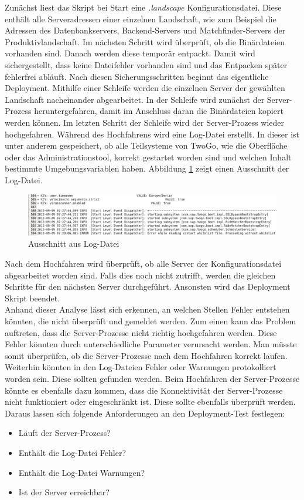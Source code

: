 Zunächst liest das Skript bei Start eine \textit{.landscape} Konfigurationsdatei. Diese enthält alle Serveradressen einer einzelnen Landschaft, wie zum Beispiel die Adressen des Datenbankservers, Backend-Servers und Matchfinder-Servers der Produktivlandschaft. Im nächsten Schritt wird überprüft, ob die Binärdateien vorhanden sind. Danach werden diese temporär entpackt. Damit wird sichergestellt, dass keine Dateifehler vorhanden sind und das Entpacken später fehlerfrei abläuft. Nach diesen Sicherungsschritten beginnt das eigentliche Deployment. Mithilfe einer Schleife werden die einzelnen Server der gewählten Landschaft nacheinander abgearbeitet. In der Schleife wird zunächst der Server-Prozess heruntergefahren, damit  im Anschluss daran die Binärdateien kopiert werden können. Im letzten Schritt der Schleife wird der Server-Prozess wieder hochgefahren. Während des Hochfahrens wird eine Log-Datei erstellt. In dieser ist unter anderem gespeichert, ob alle Teilsysteme von TwoGo, wie die Oberfläche oder das Administrationstool, korrekt gestartet worden sind und welchen Inhalt bestimmte Umgebungsvariablen haben. Abbildung \ref{fig:Log_part} zeigt einen Ausschnitt der Log-Datei.\\
\begin{figure}[H]
\centering
\includegraphics[width=1\linewidth]{../images/Log_part}
\vspace{-20pt}
\caption{Ausschnitt aus Log-Datei}
\label{fig:Log_part}
\end{figure}
 Nach dem Hochfahren wird überprüft, ob alle Server der Konfigurationsdatei abgearbeitet worden sind. Falls dies noch nicht zutrifft, werden die gleichen Schritte für den nächsten Server durchgeführt. Ansonsten wird das Deployment Skript beendet. \\
Anhand dieser Analyse lässt sich erkennen, an welchen Stellen Fehler entstehen könnten, die nicht überprüft und gemeldet werden. Zum einen kann das Problem auftreten, dass die Server-Prozesse nicht richtig hochgefahren werden. Diese Fehler könnten durch unterschiedliche Parameter verursacht werden. Man müsste somit überprüfen, ob die Server-Prozesse nach dem Hochfahren korrekt laufen. Weiterhin könnten in den Log-Dateien Fehler oder Warnungen protokolliert worden sein. Diese sollten gefunden werden. Beim Hochfahren der Server-Prozesse könnte es ebenfalls dazu kommen, dass die Konnektivität der Server-Prozesse nicht funktioniert oder eingeschränkt ist. Diese sollte ebenfalls überprüft werden.\\
Daraus lassen sich folgende Anforderungen an den Deployment-Test festlegen:
\begin{itemize}
\item Läuft der Server-Prozess?
\item Enthält die Log-Datei Fehler?
\item Enthält die Log-Datei Warnungen?
\item Ist der Server erreichbar?
\end{itemize}

